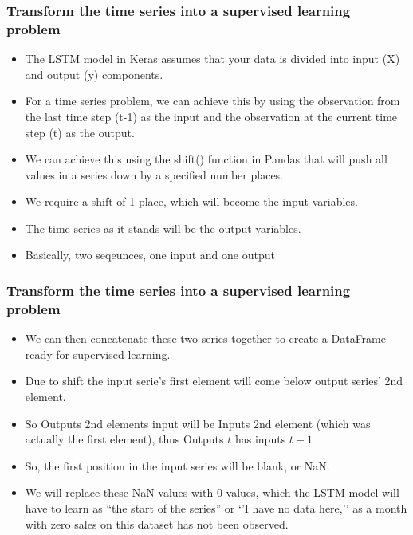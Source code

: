 \begin{frame}[fragile] \frametitle{Transform the time series into a supervised learning problem}
\begin{itemize}
\item The LSTM model in Keras assumes that your data is divided into input (X) and output (y) components.
\item For a time series problem, we can achieve this by using the observation from the last time step (t-1) as the input and the observation at the current time step (t) as the output.
\item We can achieve this using the shift() function in Pandas that will push all values in a series down by a specified number places. 
\item We require a shift of 1 place, which will become the input variables. 
\item The time series as it stands will be the output variables.
\item Basically, two seqeunces, one input and one output
\end{itemize}
\end{frame}

\begin{frame}[fragile] \frametitle{Transform the time series into a supervised learning problem}
\begin{itemize}
\item We can then concatenate these two series together to create a DataFrame ready for supervised learning. 
\item Due to shift the input serie's first element will come below output series' 2nd element.
\item So Outputs 2nd elements input will be Inputs 2nd element (which was actually the first element), thus Outputs $t$ has inputs $t-1$
\item So, the first position in the input series will be blank, or NaN. 
\item We will replace these NaN values with 0 values, which the LSTM model will have to learn as ``the start of the series'' or `'I have no data here,'' as a month with zero sales on this dataset has not been observed.
\end{itemize}
\end{frame}

